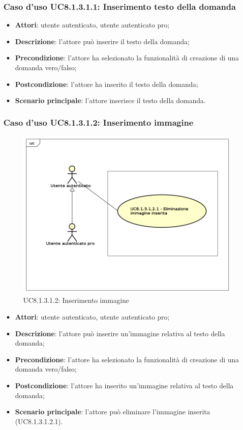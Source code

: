 \subsubsection{Caso d'uso UC8.1.3.1.1: Inserimento testo della domanda}
	\begin{itemize}
		\item
			\textbf{Attori}: utente autenticato, utente autenticato pro;
		\item		
			\textbf{Descrizione}: l'attore può inserire il testo della domanda;
		\item
			\textbf{Precondizione}: l'attore ha selezionato la funzionalità di creazione di una domanda vero/falso; 
		\item
			\textbf{Postcondizione}: l'attore ha inserito il testo della domanda;
		\item
			\textbf{Scenario principale}: l'attore inserisce il testo della domanda. 
	 			
	\end{itemize}
	
\subsubsection{Caso d'uso UC8.1.3.1.2: Inserimento immagine}
	\label{UC8.1.3.1.2}
	\begin{figure}[h]
		\centering
			\includegraphics[scale=0.45,keepaspectratio]{UML/UC8_1_3_1_2.png}
		\caption{UC8.1.3.1.2: Inserimento immagine}
	\end{figure}
	\FloatBarrier
	\begin{itemize}
		\item
			\textbf{Attori}: utente autenticato, utente autenticato pro;
		\item		
			\textbf{Descrizione}: l'attore può inserire un'immagine relativa al testo della domanda;
		\item
			\textbf{Precondizione}: l'attore ha selezionato la funzionalità di creazione di una domanda vero/falso; 
		\item
			\textbf{Postcondizione}: l'attore ha inserito un'immagine relativa al testo della domanda;
		\item
			\textbf{Scenario principale}: l'attore può eliminare l'immagine inserita (UC8.1.3.1.2.1).						
	\end{itemize}
	
